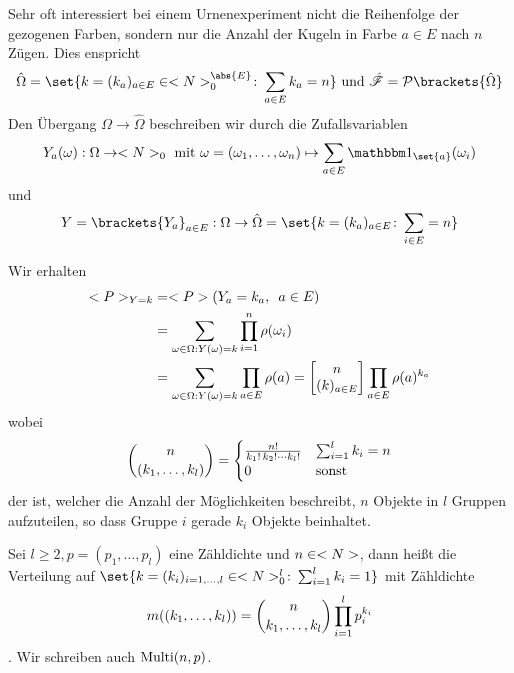 Sehr oft interessiert bei einem Urnenexperiment nicht die Reihenfolge der gezogenen Farben, sondern nur die Anzahl der Kugeln in Farbe $a \in E$ nach $n$ Zügen. Dies enspricht
\begin{align}
	 \hat{\Omega} 
	 = \set{k = (k_a)_{a \in E} \in \N_{0}^{\abs{E}} \colon \sum_{a \in E} k_a = n}
	 \und \hat{\sigF} = \pows\brackets{\hat{\Omega}}\notag
\end{align}
Den Übergang $\Omega \to \hat{\Omega}$ beschreiben wir durch die Zufallsvariablen
\begin{align}
	Y_a(\omega): \Omega \to \N_{0} \mit \omega = (\omega_1,\dots, \omega_n)\mapsto \sum_{a \in E} \indi_{\set{a}}(\omega_i)\notag
\end{align}
und
\begin{align}
	Y = \brackets{Y_a}_{a\in E}: \Omega \to \hat{\Omega} = \set{k = (k_a)_{a\in E}\colon \sum_{i \in E} = n}\notag
\end{align}


Wir erhalten
\begin{align}
	<P>_{Y = k} &= <P>(Y_a = k_a, \enskip a \in E)\\
	&= \sum_{\omega \in \Omega: Y(\omega) = k} \prod_{i=1}^{n} \rho(\omega_i)\\
	&= \sum_{\omega \in \Omega: Y(\omega) = k} \prod_{a \in E} \rho(a) = \begin{bmatrix}
	n \\
	(k)_{a\in E}
	\end{bmatrix}
	\prod_{a \in E} \rho(a)^{k_a}\notag
\end{align}
wobei
\begin{align}
	\binom{n}{(k_1, \dots, k_l)} = \begin{cases}
	\frac{n!}{k_1 ! \, k_2 ! \cdots k_l !} & \sum_{i=1}^{l} k_i = n\\
	0 & \text{sonst }
	\end{cases}\notag
\end{align}
der  ist, welcher die Anzahl der Möglichkeiten beschreibt, $n$ Objekte in $l$ Gruppen aufzuteilen, so dass Gruppe $i$ gerade $k_i$ Objekte beinhaltet.

\begin{definition}
	Sei $l \ge 2, p = (p_1, \dots, p_l)$ eine Zähldichte und $n \in <N>$, dann heißt die Verteilung auf $\set{k = (k_i)_{i=1,\dots,l} \in \N_{0}^{l} \colon \sum_{i=1}^{l} k_i = 1}$ mit Zähldichte
	\begin{align}
		m((k_1,\dots,k_l)) = \binom{n}{k_1, \dots, k_l}\prod_{i=1}^{l} p_i^{k_i}\notag
	\end{align}
	. Wir schreiben auch $\operatorname{Multi}(n,p)$. %
\end{definition}

